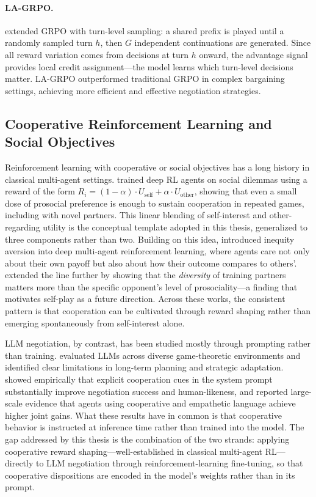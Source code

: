 \documentclass[12pt,a4paper]{article}
\begin{document}
\paragraph{LA-GRPO.} \citet{franceschetti2025advantage} extended GRPO with turn-level sampling: a shared prefix is played until a randomly sampled turn $h$, then $G$ independent continuations are generated. Since all reward variation comes from decisions at turn $h$ onward, the advantage signal provides local credit assignment---the model learns which turn-level decisions matter. LA-GRPO outperformed traditional GRPO in complex bargaining settings, achieving more efficient and effective negotiation strategies.

\subsection{Cooperative Reinforcement Learning and Social Objectives}

Reinforcement learning with cooperative or social objectives has a long history in classical multi-agent settings. \citet{peysakhovich2017prosocial} trained deep RL agents on social dilemmas using a reward of the form $R_i = (1 - \alpha) \cdot U_{\text{self}} + \alpha \cdot U_{\text{other}}$, showing that even a small dose of prosocial preference is enough to sustain cooperation in repeated games, including with novel partners. This linear blending of self-interest and other-regarding utility is the conceptual template adopted in this thesis, generalized to three components rather than two. Building on this idea, \citet{hughes2018inequity} introduced inequity aversion into deep multi-agent reinforcement learning, where agents care not only about their own payoff but also about how their outcome compares to others'. \citet{mckee2020social} extended the line further by showing that the \emph{diversity} of training partners matters more than the specific opponent's level of prosociality---a finding that motivates self-play as a future direction. Across these works, the consistent pattern is that cooperation can be cultivated through reward shaping rather than emerging spontaneously from self-interest alone.

LLM negotiation, by contrast, has been studied mostly through prompting rather than training. \citet{duan2024gtbenchuncoveringstrategicreasoning} evaluated LLMs across diverse game-theoretic environments and identified clear limitations in long-term planning and strategic adaptation. \citet{jiang-akcakir-2025-explicit} showed empirically that explicit cooperation cues in the system prompt substantially improve negotiation success and human-likeness, and \citet{vaccaro2025advancingainegotiationsnew} reported large-scale evidence that agents using cooperative and empathetic language achieve higher joint gains. What these results have in common is that cooperative behavior is instructed at inference time rather than trained into the model. The gap addressed by this thesis is the combination of the two strands: applying cooperative reward shaping---well-established in classical multi-agent RL---directly to LLM negotiation through reinforcement-learning fine-tuning, so that cooperative dispositions are encoded in the model's weights rather than in its prompt.
\end{document}
